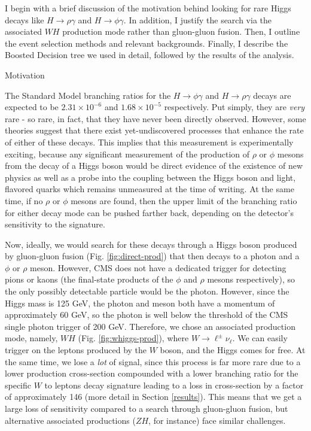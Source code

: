 %
%

I begin with a brief discussion of the motivation behind looking for rare Higgs decays like $H \rightarrow \rho\gamma$ and $H \rightarrow \phi\gamma$. In addition, I justify the search via the associated $WH$ production mode rather than gluon-gluon fusion. Then, I outline the event selection methods and relevant backgrounds. Finally, I describe the Boosted Decision tree we used in detail, followed by the results of the analysis.

\begin{section}{Motivation}\label{motivation}

The Standard Model branching ratios for the $H\rightarrow\phi\gamma$ and $H\rightarrow\rho\gamma$ decays are expected to be $2.31\times10^{-6}$ and $1.68\times10^{-5}$  respectively\cite{cite-sm-brs}. Put simply, they are \textit{very} rare - so rare, in fact, that they have never been directly observed. However, some theories\cite{cite-theory1,cite-theory2,cite-theory3} suggest that there exist yet-undiscovered processes that enhance the rate of either of these decays. This implies that this measurement is experimentally exciting, because any significant measurement of the production of $\rho$ or $\phi$ mesons from the decay of a Higgs boson would be direct evidence of the existence of new physics as well as a probe into the coupling between the Higgs boson and light, flavored quarks which remains unmeasured at the time of writing. At the same time, if no $\rho$ or $\phi$ mesons are found, then the upper limit of the branching ratio for either decay mode can be pushed farther back, depending on the detector's sensitivity to the signature.

Now, ideally, we would search for these decays through a Higgs boson produced by gluon-gluon fusion (Fig. \ref{fig:direct-prod}) that then decays to a photon and a $\phi$ or $\rho$ meson. However, CMS does not have a dedicated trigger for detecting pions or kaons (the final-state products of the $\phi$ and $\rho$ mesons respectively), so the only possibly detectable particle would be the photon. However, since the Higgs mass is 125 GeV, the photon and meson both have a momentum of approximately 60 GeV, so the photon is well below the threshold of the CMS single photon trigger of 200 GeV\cite{cite-hlt}. Therefore, we chose an associated production mode, namely, $WH$ (Fig. \ref{fig:whiggs-prod}), where $W\rightarrow\ell^{\pm}\nu_{\ell}$. We can easily trigger on the leptons produced by the $W$ boson, and the Higgs comes for free. At the same time, we lose a \textit{lot} of signal, since this process is far more rare due to a lower production cross-section compounded with a lower branching ratio for the specific $W$ to leptons decay signature leading to a loss in cross-section by a factor of approximately 146 (more detail in Section \ref{results}). This means that we get a large loss of sensitivity compared to a search through gluon-gluon fusion, but alternative associated productions ($ZH$, for instance) face similar challenges.


\end{section}
